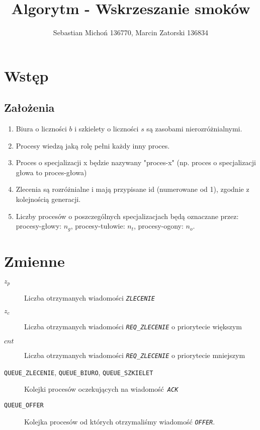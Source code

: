 \documentclass[12pt]{article}
\newcommand{\msg}[1]{\texttt{\emph{#1}}}
\newcommand{\var}[1]{\texttt{#1}}
\begin{document}
\title{Algorytm - Wskrzeszanie smoków}
\author{Sebastian Michoń 136770, Marcin Zatorski 136834}
\date{}
\maketitle

\section{Wstęp}
\subsection{Założenia}
	\begin{enumerate}
		\item Biura o liczności $b$ i szkielety o liczności $s$ są zasobami nierozróżnialnymi.
		\item Procesy wiedzą jaką rolę pełni każdy inny proces.
		\item Proces o specjalizacji x będzie nazywany "proces-x" (np. proces o specjalizacji głowa to proces-głowa)
		\item Zlecenia są rozróżnialne i mają przypisane id (numerowane od 1), zgodnie z kolejnością generacji.
		\item Liczby procesów o poszczególnych specjalizacjach będą oznaczane przez: procesy-głowy: $n_g$, procesy-tułowie: $n_t$, procesy-ogony: $n_o$.
	\end{enumerate}

\section{Zmienne}
\begin{description}
	\item[$z_p$] Liczba otrzymanych wiadomości \msg{ZLECENIE}
	\item[$z_c$] Liczba otrzymanych wiadomości \msg{REQ\_ZLECENIE} o priorytecie większym
	\item[$cnt$] Liczba otrzymanych wiadomości \msg{REQ\_ZLECENIE} o priorytecie mniejszym
	
	\item[\var{QUEUE\_ZLECENIE}, \var{QUEUE\_BIURO}, \var{QUEUE\_SZKIELET}] Kolejki procesów oczekujących na wiadomość \msg{ACK}
	\item[\var{QUEUE\_OFFER}] Kolejka procesów od których otrzymaliśmy wiadomość \msg{OFFER}.
\end{description}
\end{document}
